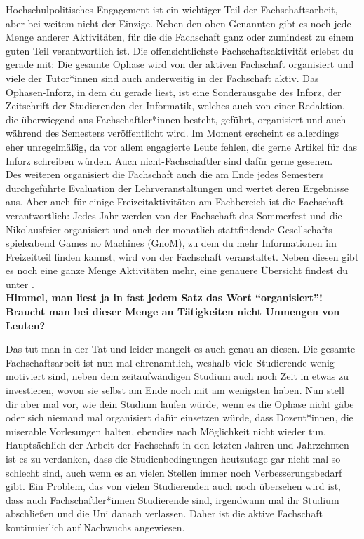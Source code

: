 {Hochschulpolitisches Engagement ist ein wichtiger Teil der Fachschaftsarbeit, aber bei weitem nicht der Einzige. Neben den oben Genannten gibt es noch jede Menge anderer Aktivitäten, für die die Fachschaft ganz oder zumindest zu einem guten Teil verantwortlich ist. Die offensichtlichste Fachschaftsaktivität erlebst du gerade mit: Die gesamte Ophase wird von der aktiven Fachschaft organisiert und viele der Tutor*innen sind auch anderweitig in der Fachschaft aktiv. Das Ophasen-Inforz, in dem du gerade liest, ist eine Sonderausgabe des Inforz, der Zeitschrift der Studierenden der Informatik, welches auch von einer Redaktion, die überwiegend aus Fachschaftler*innen besteht, geführt, organisiert und auch während des Semesters veröffentlicht wird. Im Moment erscheint es allerdings eher unregelmäßig, da vor allem engagierte Leute fehlen, die gerne Artikel für das Inforz schreiben würden. Auch nicht-Fachschaftler sind dafür gerne gesehen.\\
Des weiteren organisiert die Fachschaft auch die am Ende jedes Semesters durchgeführte Evaluation der Lehrveranstaltungen und wertet deren Ergebnisse aus. Aber auch für einige Freizeitaktivitäten am Fachbereich ist die Fachschaft verantwortlich: Jedes Jahr werden von der Fachschaft das Sommerfest und die Nikolausfeier organisiert und auch der monatlich stattfindende Gesellschafts-spieleabend Games no Machines (GnoM), zu dem du mehr Informationen im Freizeitteil finden kannst, wird von der Fachschaft veranstaltet. Neben diesen gibt es noch eine ganze Menge Aktivitäten mehr, eine genauere Übersicht findest du unter \footnotemark[2].\\

\textbf{Himmel, man liest ja in fast jedem Satz das Wort "`organisiert"'! Braucht man bei dieser Menge an Tätigkeiten nicht Unmengen von Leuten?}

Das tut man in der Tat und leider mangelt es auch genau an diesen. Die gesamte Fachschaftsarbeit ist nun mal ehrenamtlich, weshalb viele Studierende wenig motiviert sind, neben dem zeitaufwändigen Studium auch noch Zeit in etwas zu investieren, wovon sie selbst am Ende noch mit am wenigsten haben. Nun stell dir aber mal vor, wie dein Studium laufen würde, wenn es die Ophase nicht gäbe oder sich niemand mal organisiert dafür einsetzen würde, dass Dozent*innen, die miserable Vorlesungen halten, ebendies nach Möglichkeit nicht wieder tun. Hauptsächlich der Arbeit der Fachschaft in den letzten Jahren und Jahrzehnten ist es zu verdanken, dass die Studienbedingungen heutzutage gar nicht mal so schlecht sind, auch wenn es an vielen Stellen immer noch Verbesserungsbedarf gibt. Ein Problem, das von vielen Studierenden auch noch übersehen wird ist, dass auch Fachschaftler*innen Studierende sind, irgendwann mal ihr Studium abschließen und die Uni danach verlassen. Daher ist die aktive Fachschaft kontinuierlich auf Nachwuchs angewiesen.\\

}
